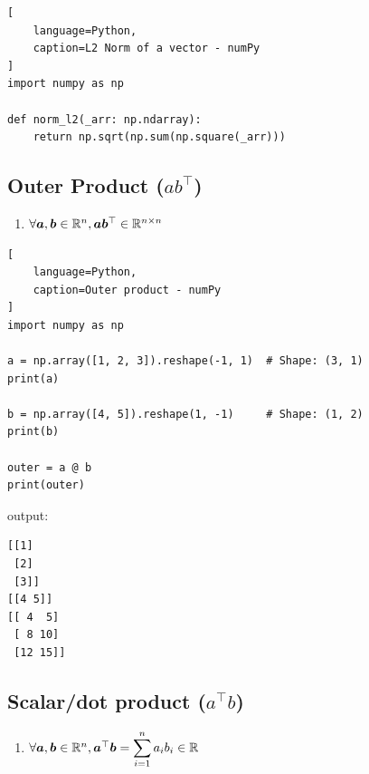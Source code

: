 \begin{lstlisting}[
    language=Python,
    caption=L2 Norm of a vector - numPy
]
import numpy as np

def norm_l2(_arr: np.ndarray):
    return np.sqrt(np.sum(np.square(_arr)))

\end{lstlisting}








\subsection{Outer Product ($ab^\top$) }

\begin{enumerate}
    \item $\forall \bm{a}, \bm{b} \in \mathbb{R}^n, \bm{ab}^\top \in \mathbb{R}^{n\times n}$
    \hfill \cite{mfml/book/mml/Deisenroth-Faisal-Ong}

\end{enumerate}


\begin{lstlisting}[
    language=Python,
    caption=Outer product - numPy
]
import numpy as np

a = np.array([1, 2, 3]).reshape(-1, 1)  # Shape: (3, 1)
print(a)

b = np.array([4, 5]).reshape(1, -1)     # Shape: (1, 2)
print(b)

outer = a @ b
print(outer)
\end{lstlisting}

output:
\begin{lstlisting}
[[1]
 [2]
 [3]]
[[4 5]]
[[ 4  5]
 [ 8 10]
 [12 15]]
\end{lstlisting}










\subsection{Scalar/dot product ($a^\top b$)}


\begin{enumerate}
    \item $
        \forall \bm{a}, \bm{b} \in \mathbb{R}^n,
        \bm{a}^\top \bm{b} = \displaystyle\sum^n_{i=1} a_i b_i \in \mathbb{R}
    $
    \hfill \cite{mfml/book/mml/Deisenroth-Faisal-Ong}

\end{enumerate}




